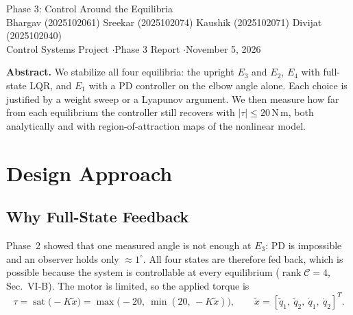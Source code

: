 \documentclass[10pt,letterpaper]{article}
\newcommand{\Nm}{\,\mathrm{N\,m}}
\newenvironment{keep}{\par\noindent\begin{minipage}{\linewidth}}{\end{minipage}\par\smallskip}
\begin{document}
\clearpage
{}\label{phase3}
\begin{center}
\begin{singlespace}
{\fontsize{17}{20}\selectfont Phase 3: Control Around the Equilibria}\\[4pt]
{\small Bhargav (2025102061) \quad Sreekar (2025102074) \quad Kaushik (2025102071) \quad Divijat (2025102040)}\\[1pt]
{\footnotesize Control Systems Project \quad$\cdot$\quad Phase 3 Report \quad$\cdot$\quad November 5, 2026}
\end{singlespace}
\end{center}
\vspace{-6pt}
{\small\textbf{Abstract.} We stabilize all four equilibria: the upright $E_3$ and $E_2$, $E_4$ with full-state LQR, and $E_1$ with a PD controller on the elbow angle alone. Each choice is justified by a weight sweep or a Lyapunov argument. We then measure how far from each equilibrium the controller still recovers with $|\tau|\le20\Nm$, both analytically and with region-of-attraction maps of the nonlinear model.\par}

\begin{keep}
\section{Design Approach}
\subsection{Why Full-State Feedback}
Phase~2 showed that one measured angle is not enough at $E_3$: PD is impossible and an observer holds only $\approx1^\circ$. All four states are therefore fed back, which is possible because the system is controllable at every equilibrium ($\operatorname{rank}\mathcal C=4$, Sec.~VI-B). The motor is limited, so the applied torque is
\begin{equation}
\tau=\operatorname{sat}\!\big(-K\tilde x\big)=\max\!\big(-20,\ \min(20,\,-K\tilde x)\big),\qquad \tilde x=[\tilde q_1,\ \tilde q_2,\ \dot q_1,\ \dot q_2]^T .\label{eq:sat}
\end{equation}
\end{keep}
\end{document}
